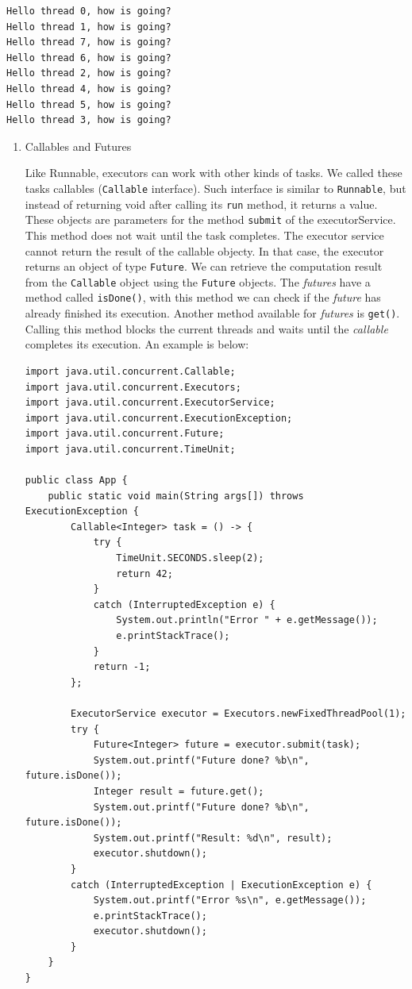 \documentclass{latex/classes/thesis}
\begin{document}
\begin{verbatim}
Hello thread 0, how is going?
Hello thread 1, how is going?
Hello thread 7, how is going?
Hello thread 6, how is going?
Hello thread 2, how is going?
Hello thread 4, how is going?
Hello thread 5, how is going?
Hello thread 3, how is going?
\end{verbatim}

\begin{enumerate}
\item Callables and Futures
\label{sec:orgc40b92a}

Like Runnable, executors can work with other kinds of tasks. We called these
tasks callables (\texttt{Callable} interface). Such interface is similar to \texttt{Runnable},
but instead of returning void after calling its \texttt{run} method, it returns a
value. These objects are parameters for the method \texttt{submit} of the
executorService. This method does not wait until the task completes. The
executor service cannot return the result of the callable objecty. In that
case, the executor returns an object of type \texttt{Future}. We can retrieve the
computation result from the \texttt{Callable} object using the \texttt{Future} objects. The
\emph{futures} have a method called \texttt{isDone()}, with this method we can check if the
\emph{future} has already finished its execution. Another method available for
\emph{futures} is \texttt{get()}. Calling this method blocks the current threads and waits
until the \emph{callable} completes its execution. An example is below:


\begin{lstlisting}
import java.util.concurrent.Callable;
import java.util.concurrent.Executors;
import java.util.concurrent.ExecutorService;
import java.util.concurrent.ExecutionException;
import java.util.concurrent.Future;
import java.util.concurrent.TimeUnit;

public class App {
    public static void main(String args[]) throws ExecutionException {
        Callable<Integer> task = () -> {
            try {
                TimeUnit.SECONDS.sleep(2);
                return 42;
            }
            catch (InterruptedException e) {
                System.out.println("Error " + e.getMessage());
                e.printStackTrace();
            }
            return -1;
        };

        ExecutorService executor = Executors.newFixedThreadPool(1);
        try {
            Future<Integer> future = executor.submit(task);
            System.out.printf("Future done? %b\n", future.isDone());
            Integer result = future.get();
            System.out.printf("Future done? %b\n", future.isDone());
            System.out.printf("Result: %d\n", result);
            executor.shutdown();
        }
        catch (InterruptedException | ExecutionException e) {
            System.out.printf("Error %s\n", e.getMessage());
            e.printStackTrace();
            executor.shutdown();
        }
    }
}
\end{lstlisting}


\end{enumerate}
\end{document}
